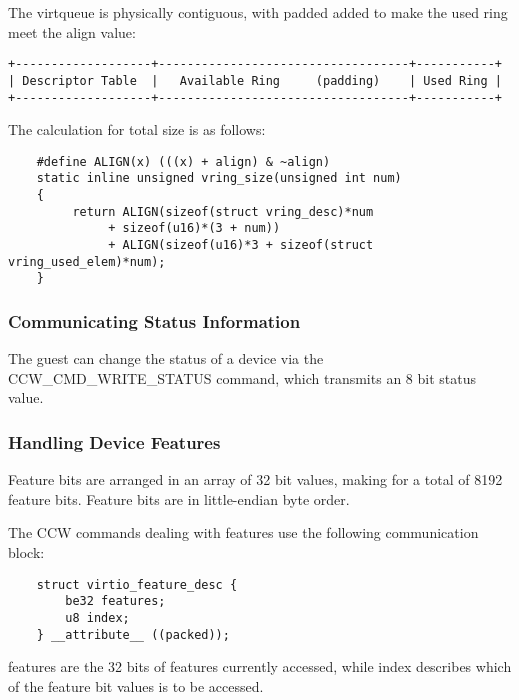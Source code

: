 The virtqueue is physically contiguous, with padded added to make the
used ring meet the align value:

\begin{verbatim}
+-------------------+-----------------------------------+-----------+
| Descriptor Table  |   Available Ring     (padding)    | Used Ring |
+-------------------+-----------------------------------+-----------+
\end{verbatim}

The calculation for total size is as follows:

\begin{lstlisting}
	#define ALIGN(x) (((x) + align) & ~align)
	static inline unsigned vring_size(unsigned int num)
	{
	     return ALIGN(sizeof(struct vring_desc)*num
			  + sizeof(u16)*(3 + num))
	          + ALIGN(sizeof(u16)*3 + sizeof(struct vring_used_elem)*num);
	}
\end{lstlisting}

\subsubsection{Communicating Status Information}\label{sec:Virtio Transport Options / Virtio over channel I/O / Device Initialization / Communicating Status Information}

The guest can change the status of a device via the
CCW_CMD_WRITE_STATUS command, which transmits an 8 bit status
value.

\subsubsection{Handling Device Features}\label{sec:Virtio Transport Options / Virtio over channel I/O / Device Initialization / Handling Device Features}

Feature bits are arranged in an array of 32 bit values, making
for a total of 8192 feature bits. Feature bits are in
little-endian byte order.

The CCW commands dealing with features use the following
communication block:

\begin{lstlisting}
	struct virtio_feature_desc {
		be32 features;
		u8 index;
	} __attribute__ ((packed));
\end{lstlisting}

features are the 32 bits of features currently accessed, while
index describes which of the feature bit values is to be
accessed.

